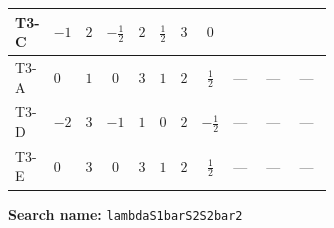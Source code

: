 \documentclass[8pt]{article}
\begin{document}
\begin{landscape}
\begin{longtable}{@{}llcccccc >{\raggedright\arraybackslash}p{0.21\linewidth} >{\raggedright\arraybackslash}p{0.21\linewidth} >{\raggedright\arraybackslash}p{0.21\linewidth}@{}}
T3-C & $-1$ & $2$ & $-\frac{1}{2}$ & $2$ & $\frac{1}{2}$ & $3$ & $0$ & \scriptsize\adjustbox{max width=\linewidth}{$\begin{gathered} 4 \left({\lambda_{H^\dagger H^\dagger S_2 S_2}}\right)^{*} \left({\lambda_{T3}}\right)^{*}\end{gathered}$} & \scriptsize\adjustbox{max width=\linewidth}{$\begin{gathered} +4 {\lambda_{S_1^{\dagger 2}S_2^{\dagger 2}}} (5 \left({\lambda_{S_1^\dagger S_2 S_2^{\dagger 2}}}\right)^{*}+\left({\lambda_{S_1 S_1^{\dagger 2}S_2^\dagger}}\right)^{*})\end{gathered}$} & \scriptsize\adjustbox{max width=\linewidth}{$\begin{gathered} -9 {g_2}^2 {\lambda_{S_1^\dagger S_2 S_2^{\dagger 2}}}\end{gathered}$} \\
\midrule
T3-A & $0$ & $1$ & $0$ & $3$ & $1$ & $2$ & $\frac{1}{2}$ & --- & --- & --- \\
\midrule
T3-D & $-2$ & $3$ & $-1$ & $1$ & $0$ & $2$ & $-\frac{1}{2}$ & --- & --- & --- \\
\midrule
T3-E & $0$ & $3$ & $0$ & $3$ & $1$ & $2$ & $\frac{1}{2}$ & --- & --- & --- \\
\midrule
\bottomrule
\end{longtable}
\clearpage
\noindent\textbf{Search name: }\texttt{lambdaS1barS2S2bar2}\par\smallskip

\end{landscape}
\end{document}
